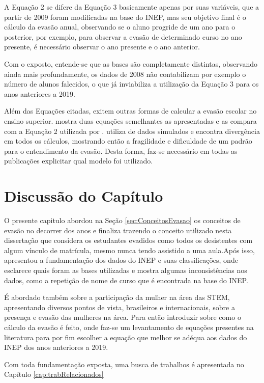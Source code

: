 A Equação 2 se difere da Equação 3 basicamente apenas por suas variáveis, que a partir de 2009 foram modificadas na base do INEP, mas seu objetivo final é o cálculo da evasão anual, observando se o aluno progride de um ano para o posterior, por exemplo, para observar a evasão de determinado curso no ano presente, é necessário observar o ano presente e o ano anterior.

Com o exposto, entende-se que as bases são completamente distintas, observando ainda mais profundamente, os dados de 2008 não contabilizam por exemplo o número de alunos falecidos, o que já inviabiliza a utilização da Equação 3 para os anos anteriores a 2019.

Além das Equações citadas, exitem outras formas de calcular a evasão escolar no ensino superior.  mostra duas equações semelhantes as apresentadas e as compara com a Equação 2 utilizada por .  utiliza de dados simulados e encontra divergência em todos os cálculos, mostrando então a fragilidade e dificuldade de um padrão para o entendimento da evasão. Desta forma, faz-se necessário em todas as publicações explicitar qual modelo foi utilizado. %


\section{Discussão do Capítulo}\label{sec:discussaoCapitulo}

O presente capitulo abordou na Seção \ref{sec:ConceitosEvasao} os conceitos de evasão no decorrer dos anos e finaliza trazendo o conceito utilizado nesta dissertação que considera os estudantes evadidos como todos os  desistentes com algum vínculo de matrícula, mesmo
nunca tendo assistido a uma aula.Após isso, apresentou a fundamentação dos dados do INEP e suas classificações, onde esclarece quais foram as bases utilizadas e mostra algumas inconsistências nos dados, como a repetição de nome de curso que é encontrada na base do INEP.

É abordado também sobre a participação da mulher na área das STEM, apresentando diversos pontos de vista, brasileiros e internacionais, sobre a presença e evasão das mulheres na área. Para então introduzir sobre como o cálculo da evasão é feito, onde faz-se um levantamento de equações presentes na literatura para por fim escolher a equação que melhor se adéqua aos dados do INEP dos anos anteriores a 2019. 

Com toda fundamentação exposta, uma busca de trabalhos é apresentada no Capítulo \ref{cap:trabRelacionados}



